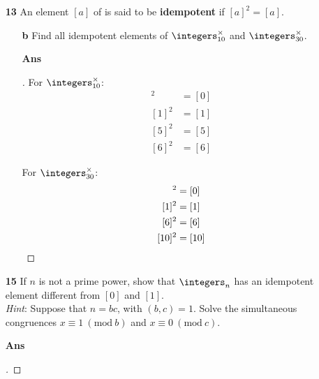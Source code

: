 \documentclass[paper=usletter, fontsize=12pt]{article}
\newcommand{\Mod}[1]{\ (\mathrm{mod}\ #1)}
\begin{document}
\begin{itemize}
\begin{itemize}
            \item[\textbf{13}] An element $[a]$ of is said to be
            \textbf{idempotent} if $[a]^2=[a]$.
            \begin{itemize}

                \item[\textbf{b}] Find all idempotent elements of
                $\integers_{10}^\times$ and $\integers_{30}^\times$.
                \item[\textbf{Ans}]
                \begin{proof}[\unskip\nopunct]
                    For $\integers_{10}^\times$:
                    \begin{align*}
                        [0]^2 & = [0]\\
                        [1]^2 & = [1]\\
                        [5]^2 & = [5]\\
                        [6]^2 & = [6]
                    \end{align*}

                    For $\integers_{30}^\times$:
                    \begin{align*}
                        [0]^2 & = [0]\\
                        [1]^2 & = [1]\\
                        [6]^2 & = [6]\\
                        [10]^2 & = [10] \qedhere
                    \end{align*}

                \end{proof}
                \vspace{0.2in}

            \end{itemize}

            \item[\textbf{15}] If $n$ is not a prime power, show that
            $\integers_n$ has an idempotent element different from $[0]$ and
            $[1]$.\\ \textit{Hint}: Suppose that $n=bc$, with $(b, c)=1$. Solve
            the simultaneous congruences $x \equiv 1 \Mod{b}$ and $x
            \equiv 0 \Mod{c}$.
            \item[\textbf{Ans}]
            \begin{proof}[\unskip\nopunct]
            \end{proof}
            \vspace{0.2in}


\end{itemize}
\end{itemize}
\end{document}
